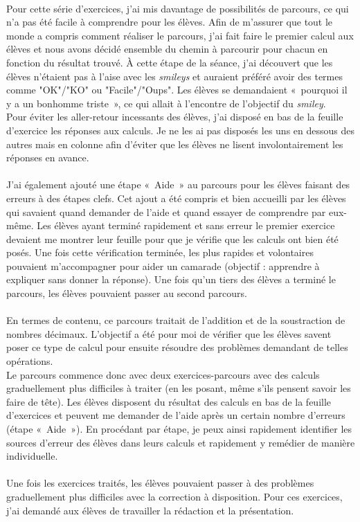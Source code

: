 \paragraph{}Pour cette série d'exercices, j'ai mis davantage de possibilités de parcours, ce qui n'a pas été facile à comprendre pour les élèves. Afin de m'assurer que tout le monde a compris comment réaliser le parcours, j'ai fait faire le premier calcul aux élèves et nous avons décidé ensemble du chemin à parcourir pour chacun en fonction du résultat trouvé. À cette étape de la séance, j'ai découvert que les élèves n'étaient pas à l'aise avec les \textit{smileys} et auraient préféré avoir des termes comme "OK"/"KO" ou "Facile"/"Oups". Les élèves se demandaient « pourquoi il y a un bonhomme triste », ce qui allait à l'encontre de l'objectif du \textit{smiley}.\\
Pour éviter les aller-retour incessants des élèves, j'ai disposé en bas de la feuille d'exercice les réponses aux calculs. Je ne les ai pas disposés les uns en dessous des autres mais en colonne afin d'éviter que les élèves ne lisent involontairement les réponses en avance.
\paragraph{}J'ai également ajouté une étape « Aide » au parcours pour les élèves faisant des erreurs à des étapes clefs. Cet ajout a été compris et bien accueilli par les élèves qui savaient quand demander de l'aide et quand essayer de comprendre par eux-même. Les élèves ayant terminé rapidement et sans erreur le premier exercice devaient me montrer leur feuille pour que je vérifie que les calculs ont bien été posés. Une fois cette vérification terminée, les plus rapides et volontaires pouvaient m'accompagner pour aider un camarade (objectif : apprendre à expliquer sans donner la réponse). Une fois qu'un tiers des élèves a terminé le parcours, les élèves pouvaient passer au second parcours.
\paragraph{} En termes de contenu, ce parcours traitait de l'addition et de la soustraction de nombres décimaux. L'objectif a été pour moi de vérifier que les élèves savent poser ce type de calcul pour ensuite résoudre des problèmes demandant de telles opérations.\\
Le parcours commence donc avec deux exercices-parcours avec des calculs graduellement plus difficiles à traiter (en les posant, même s'ils pensent savoir les faire de tête). Les élèves disposent du résultat des calculs en bas de la feuille d'exercices et peuvent me demander de l'aide après un certain nombre d'erreurs (étape « Aide »). En procédant par étape, je peux ainsi rapidement identifier les sources d'erreur des élèves dans leurs calculs et rapidement y remédier de manière individuelle.\\
\\
Une fois les exercices traités, les élèves pouvaient passer à des problèmes graduellement plus difficiles avec la correction à disposition. Pour ces exercices, j'ai demandé aux élèves de travailler la rédaction et la présentation.


